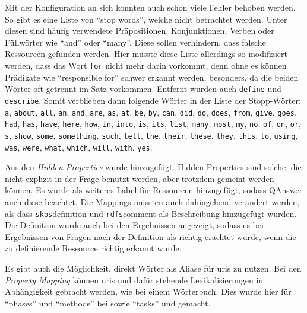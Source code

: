 Mit der Konfiguration an sich konnten auch schon viele Fehler behoben werden.
So gibt es eine Liste von \enquote{stop words}, welche nicht betrachtet werden.
Unter diesen sind häufig verwendete Präpositionen, Konjunktionen, Verben oder Füllwörter wie \enquote{and} oder \enquote{many}.
Diese sollen verhindern, dass falsche Ressourcen gefunden werden.
Hier musste diese Liste allerdings so modifiziert werden, dass das Wort \texttt{for} nicht mehr darin vorkommt, denn ohne es können Prädikate wie \enquote{responsible for} schwer erkannt werden,
besonders, da die beiden Wörter oft getrennt im Satz vorkommen.
Entfernt wurden auch \texttt{define} und \texttt{describe}.
Somit verblieben dann folgende Wörter in der Liste der Stopp-Wörter:
\texttt{a}, \texttt{about}, \texttt{all}, \texttt{an}, \texttt{and}, \texttt{are}, \texttt{as}, \texttt{at}, \texttt{be}, \texttt{by}, \texttt{can}, \texttt{did}, \texttt{do}, \texttt{does}, \texttt{from}, \texttt{give}, \texttt{goes}, \texttt{had}, \texttt{has}, \texttt{have}, \texttt{here}, \texttt{how}, \texttt{in}, \texttt{into}, \texttt{is}, \texttt{its}, \texttt{list}, \texttt{many}, \texttt{most}, \texttt{my}, \texttt{no}, \texttt{of}, \texttt{on}, \texttt{or}, \texttt{s}, \texttt{show}, \texttt{some}, \texttt{something}, \texttt{such}, \texttt{tell}, \texttt{the}, \texttt{their}, \texttt{these}, \texttt{they}, \texttt{this}, \texttt{to}, \texttt{using}, \texttt{was}, \texttt{were}, \texttt{what}, \texttt{which}, \texttt{will}, \texttt{with}, \texttt{yes}.

Aus den \emph{Hidden Properties} wurde  hinzugefügt.
Hidden Properties sind solche, die nicht explizit in der Frage benutzt werden, aber trotzdem gemeint werden können.
Es wurde  als weiteres Label für Ressourcen hinzugefügt, sodass QAnswer auch diese beachtet.
Die Mappings mussten auch dahingehend verändert werden, als dass \texttt{skos}{definition}
und \texttt{rdfs}{comment} als Beschreibung hinzugefügt wurden.
Die Definition wurde auch bei den Ergebnissen angezeigt, sodass es bei Ergebnissen von Fragen nach der Definition als richtig erachtet wurde, wenn die zu definierende Ressource richtig erkannt wurde.

Es gibt auch die Möglichkeit, direkt Wörter als Aliase für \acp{uri} zu nutzen.
Bei den \emph{Property Mapping} können \acp{uri} und dafür stehende Lexikalisierungen in Abhängigkeit gebracht werden, wie bei einem Wörterbuch.
Dies wurde hier für \enquote{phases} und \enquote{methods} bei  sowie \enquote{tasks} und  gemacht.

